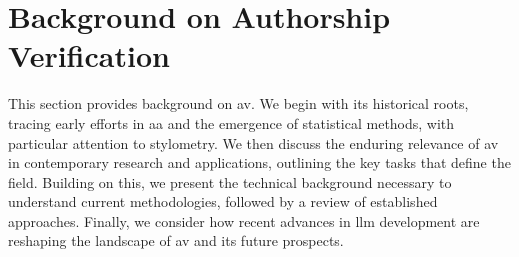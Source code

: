 \chapter{Background on Authorship Verification}
\label{chap:authorship_identification}

This section provides background on \ac{av}. 
We begin with its historical roots, tracing early efforts in \ac{aa} and the emergence of statistical methods, with particular attention to stylometry. 
We then discuss the enduring relevance of \ac{av} in contemporary research and applications, outlining the key tasks that define the field. 
Building on this, we present the technical background necessary to understand current methodologies, followed by a review of established approaches. 
Finally, we consider how recent advances in \ac{llm} development are reshaping the landscape of \ac{av} and its future prospects.










% 



